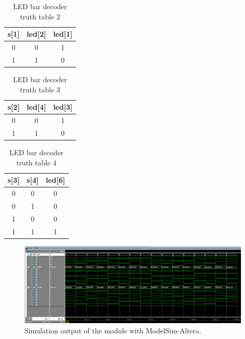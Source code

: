 \documentclass[11pt]{article}
\begin{document}
\begin{table}[h]
\centering
\begin{tabular}{|c|c|c|}
\hline
\textbf{s{[}1{]}} & \textbf{led{[}2{]}} & \textbf{led{[}1{]}} \\ \hline
0                 & 0                   & 1                   \\ \hline
1                 & 1                   & 0                   \\ \hline
\end{tabular}
\caption{LED bar decoder truth table 2}
\label{table:bar2}
\end{table}


\begin{table}[h]
\centering
\begin{tabular}{|c|c|c|}
\hline
\textbf{s{[}2{]}} & \textbf{led{[}4{]}} & \textbf{led{[}3{]}} \\ \hline
0                 & 0                   & 1                   \\ \hline
1                 & 1                   & 0                   \\ \hline
\end{tabular}
\caption{LED bar decoder truth table 3}
\label{table:bar3}
\end{table}


\begin{table}[h]
\centering
\begin{tabular}{|c|c|c|}
\hline
\textbf{s{[}3{]}} & \textbf{s{[}4{]}} & \textbf{led{[}6{]}} \\ \hline
0                 & 0                 & 0                   \\ \hline
0                 & 1                 & 0                   \\ \hline
1                 & 0                 & 0                   \\ \hline
1                 & 1                 & 1                   \\ \hline
\end{tabular}
\caption{LED bar decoder truth table 4}
\label{table:bar4}
\end{table}

\begin{figure}[h!]
\centering
\includegraphics[scale=0.54, angle=90]{wave.png}
\caption{Simulation output of the module with ModelSim-Altera.}
\label{figure:wave}
\end{figure} 
\end{document}
